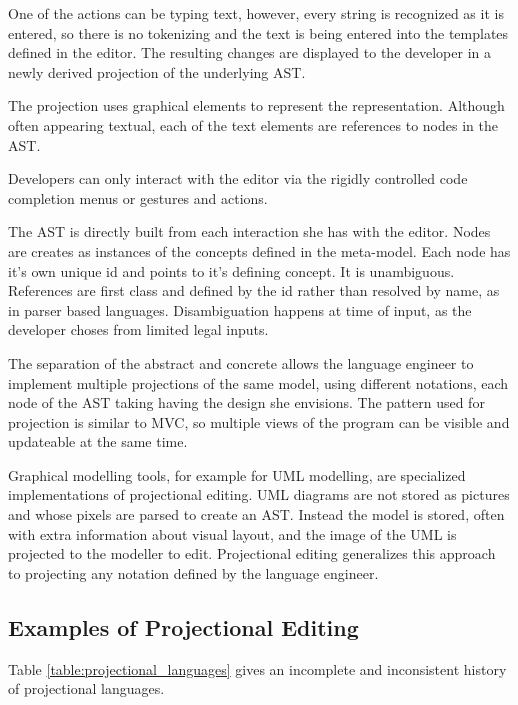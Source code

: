 One of the actions can be typing text, however, every string is recognized as it is entered, so there is no tokenizing and the text is being entered into the templates defined in the editor.
The resulting changes are displayed to the developer in a newly derived projection of the underlying AST.

The projection uses graphical elements to represent the representation.
Although often appearing textual, each of the text elements are references to nodes in the AST.

Developers can only interact with the editor via the rigidly controlled code completion menus or gestures and actions.
    
The AST is directly built from each interaction she has with the editor.
Nodes are creates as instances of the concepts defined in the meta-model.
Each node has it's own unique id and points to it's defining concept.
It is unambiguous.
References are first class and defined by the id rather than resolved by name, as in parser based languages.
Disambiguation happens at time of input, as the developer choses from limited legal inputs.

The separation of the abstract and concrete allows the language engineer to implement multiple projections of the same model, using different notations, each node of the AST taking having the design she envisions.
The pattern used for projection is similar to MVC, so multiple views of the program can be visible and updateable at the same time.

Graphical modelling tools, for example for UML modelling, are specialized implementations of projectional editing.
UML diagrams are not stored as pictures and whose pixels are parsed to create an AST.
Instead the model is stored, often with extra information about visual layout, and the image of the UML is projected to the modeller to edit.
Projectional editing generalizes this approach to projecting any notation defined by the language engineer.



\subsection{Examples of Projectional Editing}

Table \ref{table:projectional_languages} gives an incomplete and inconsistent history of projectional languages.

